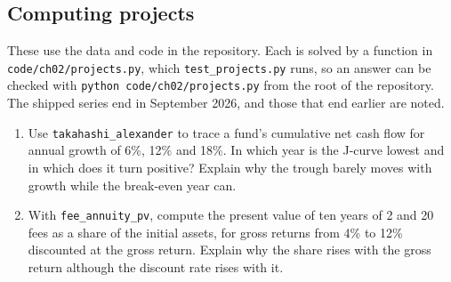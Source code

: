 \begin{chapterrefs}
\subsection*{Computing projects}
\label{sec2:projects}
These use the data and code in the repository. Each is solved by a function in
\texttt{code/ch02/projects.py}, which \texttt{test\_projects.py} runs, so an answer can be
checked with \texttt{python code/ch02/projects.py} from the root of the repository. The
shipped series end in September 2026, and those that end earlier are noted.

\begin{enumerate}[label=\textbf{P2.\arabic*}, leftmargin=*, ref=P2.\arabic*]
\item Use \texttt{takahashi\_alexander} to trace a fund's cumulative net cash flow for annual growth of 6\%, 12\%
and 18\%. In which year is the J-curve lowest and in which does it turn positive? Explain why the trough
barely moves with growth while the break-even year can.
\item With \texttt{fee\_annuity\_pv}, compute the present value of ten years of 2 and 20 fees as a share of
the initial assets, for gross returns from 4\% to 12\% discounted at the gross return. Explain why the share
rises with the gross return although the discount rate rises with it.
\end{enumerate}


\end{chapterrefs}
